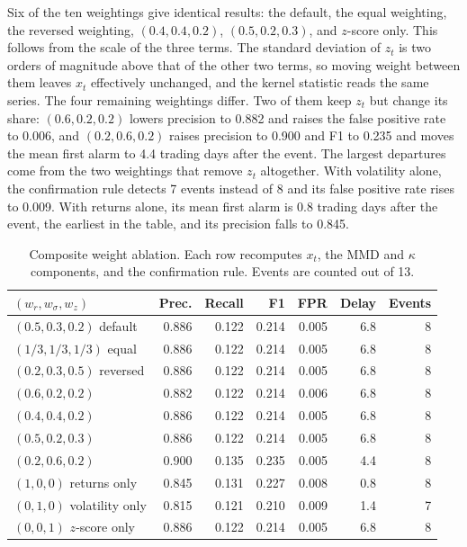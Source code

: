 \documentclass[pdflatex,sn-mathphys-num,iicol]{sn-jnl}
\begin{document}
Six of the ten weightings give identical results: the default, the equal weighting, the reversed weighting, $(0.4,0.4,0.2)$, $(0.5,0.2,0.3)$, and $z$-score only. This follows from the scale of the three terms. The standard deviation of $z_t$ is two orders of magnitude above that of the other two terms, so moving weight between them leaves $x_t$ effectively unchanged, and the kernel statistic reads the same series. The four remaining weightings differ. Two of them keep $z_t$ but change its share: $(0.6,0.2,0.2)$ lowers precision to 0.882 and raises the false positive rate to 0.006, and $(0.2,0.6,0.2)$ raises precision to 0.900 and F1 to 0.235 and moves the mean first alarm to 4.4 trading days after the event. The largest departures come from the two weightings that remove $z_t$ altogether. With volatility alone, the confirmation rule detects 7 events instead of 8 and its false positive rate rises to 0.009. With returns alone, its mean first alarm is 0.8 trading days after the event, the earliest in the table, and its precision falls to 0.845.

\begin{table}[t]
\centering
\caption{Composite weight ablation. Each row recomputes $x_t$, the MMD and $\kappa$ components, and the confirmation rule. Events are counted out of 13.}
\label{tab:weights}
\scriptsize
\begin{tabular}{lrrrrrr}
\toprule
$(w_r,w_\sigma,w_z)$ & Prec. & Recall & F1 & FPR & Delay & Events\\
\midrule
$(0.5,0.3,0.2)$ default & 0.886 & 0.122 & 0.214 & 0.005 & 6.8 & 8\\
$(1/3,1/3,1/3)$ equal & 0.886 & 0.122 & 0.214 & 0.005 & 6.8 & 8\\
$(0.2,0.3,0.5)$ reversed & 0.886 & 0.122 & 0.214 & 0.005 & 6.8 & 8\\
$(0.6,0.2,0.2)$ & 0.882 & 0.122 & 0.214 & 0.006 & 6.8 & 8\\
$(0.4,0.4,0.2)$ & 0.886 & 0.122 & 0.214 & 0.005 & 6.8 & 8\\
$(0.5,0.2,0.3)$ & 0.886 & 0.122 & 0.214 & 0.005 & 6.8 & 8\\
$(0.2,0.6,0.2)$ & 0.900 & 0.135 & 0.235 & 0.005 & 4.4 & 8\\
$(1,0,0)$ returns only & 0.845 & 0.131 & 0.227 & 0.008 & 0.8 & 8\\
$(0,1,0)$ volatility only & 0.815 & 0.121 & 0.210 & 0.009 & 1.4 & 7\\
$(0,0,1)$ $z$-score only & 0.886 & 0.122 & 0.214 & 0.005 & 6.8 & 8\\
\bottomrule
\end{tabular}
\end{table}
\end{document}
